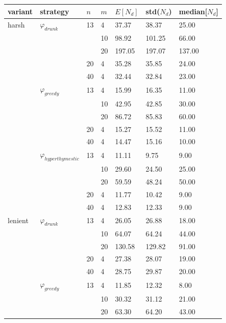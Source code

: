 \documentclass[12pt]{article}
\theoremstyle{definition}
\begin{document}
\begin{table}[]
    \begin{center}
        \begin{tabular}{@{}lllllll@{}}
        \toprule
        variant   & strategy                   & $n$ & $m$ & $E[N_d]$   & std($N_d$)  & median[$N_d$]    \\ \midrule
        harsh   & $\varphi_{drunk}$          & 13 & 4  & 37.37  & 38.37  & 25.00  \\
        & &  & 10 & 98.92  & 101.25 & 66.00  \\
        &           &  & 20 & 197.05 & 197.07 & 137.00 \\
        &           & 20 & 4  & 35.28  & 35.85  & 24.00  \\
        &           & 40 & 4  & 32.44  & 32.84  & 23.00  \\
        & $\varphi_{greedy}$         & 13 & 4  & 15.99  & 16.35  & 11.00  \\
        &          &  & 10 & 42.95  & 42.85  & 30.00  \\
        &          &  & 20 & 86.72  & 85.83  & 60.00  \\
        &          & 20 & 4  & 15.27  & 15.52  & 11.00  \\
        &          & 40 & 4  & 14.47  & 15.16  & 10.00  \\
        & $\varphi_{hyperthymestic}$ & 13 & 4  & 11.11  & 9.75   & 9.00   \\
        &  &  & 10 & 29.60  & 24.50  & 25.00  \\
        &  &  & 20 & 59.59  & 48.24  & 50.00  \\
        &  & 20 & 4  & 11.77  & 10.42  & 9.00   \\
        &  & 40 & 4  & 12.83  & 12.33  & 9.00   \\
        lenient & $\varphi_{drunk}         $ & 13 & 4  & 26.05  & 26.88  & 18.00  \\
         & &  & 10 & 64.07  & 64.24  & 44.00  \\
         & &  & 20 & 130.58 & 129.82 & 91.00  \\
         & & 20 & 4  & 27.38  & 28.07  & 19.00  \\
         & & 40 & 4  & 28.75  & 29.87  & 20.00  \\
         & $\varphi_{greedy}        $ & 13 & 4  & 11.85  & 12.32  & 8.00   \\
         & &  & 10 & 30.32  & 31.12  & 21.00  \\
         & &  & 20 & 63.30  & 64.20  & 43.00  \\

\end{tabular}
\end{center}
\end{table}
\end{document}
